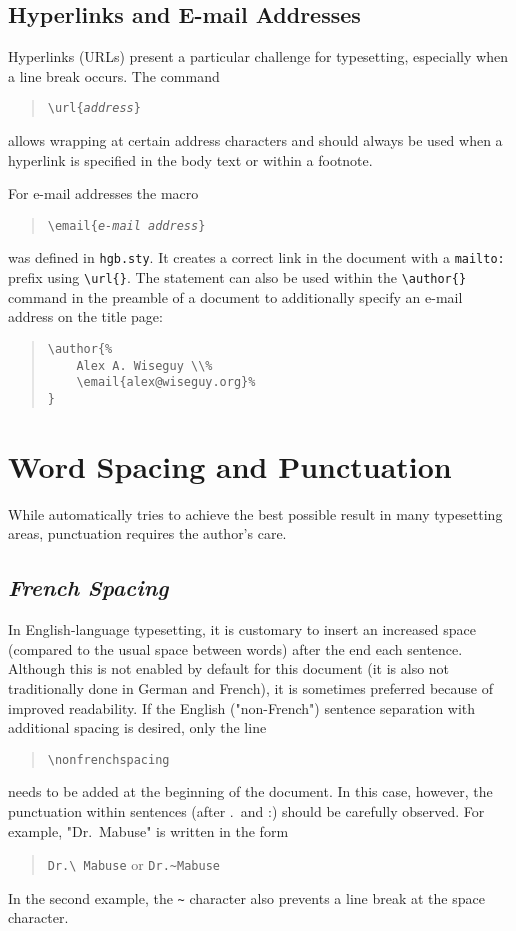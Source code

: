 \subsection{Hyperlinks and E-mail Addresses}

Hyperlinks (URLs) present a particular challenge for typesetting, especially
when a line break occurs. The command
%
\begin{quote}
    \verb!\url{!\texttt{\em address}\verb!}!
\end{quote}
%
allows wrapping at certain address characters and should always be used when a
hyperlink is specified in the body text or within a footnote.

For e-mail addresses the macro
%
\begin{quote}
    \verb!\email{!\texttt{\em e-mail address}\verb!}!
\end{quote}
%
was defined in \texttt{hgb.sty}. It creates a correct link in the document with
a \texttt{mailto:} prefix using \verb|\url{}|. The statement can also be used
within the \verb|\author{}| command in the preamble of a document to
additionally specify an e-mail address on the title page:
%
\begin{quote}
    \begin{verbatim}
\author{%
    Alex A. Wiseguy \\%
    \email{alex@wiseguy.org}%
}
    \end{verbatim}
\end{quote}
%


\section{Word Spacing and Punctuation}

While \latex automatically tries to achieve the best possible result in many
typesetting areas, punctuation requires the author's care.

\subsection{\emph{French Spacing}}

In English-language typesetting, it is customary to insert an increased space
(compared to the usual space between words) after the end each sentence.
Although this is not enabled by default for this document (it is also not
traditionally done in German and French), it is sometimes preferred because of
improved readability. If the English ("non-French") sentence separation with
additional spacing is desired, only the line
%
\begin{quote}
    \verb!\nonfrenchspacing!
\end{quote}
%
needs to be added at the beginning of the document. In this case, however, the
punctuation within sentences (after .\ and :) should be carefully observed. For
example, "Dr.\ Mabuse" is written in the form
%
\begin{quote}
    \verb!Dr.\ Mabuse! or \verb!Dr.~Mabuse!
\end{quote}
%
In the second example, the \verb!~! character also prevents a line break at the
space character.

